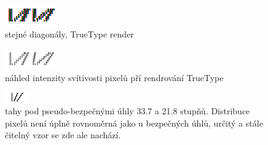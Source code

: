 \documentclass[a4paper]{article}
\begin{document}
\begin{figure}[H]
  \includegraphics[width=\linewidth]{pics/truetype.png}
  \caption{stejné diagonály, TrueType render}
\end{figure}

\begin{figure}[H]
  \includegraphics[width=\linewidth]{pics/truetype_bw.png}
  \caption{náhled intenzity svítivosti pixelů pří rendrování TrueType}
\end{figure}

\begin{figure}[H]
  \includegraphics[width=\linewidth]{pics/pseudo.png}
  \caption{tahy pod pseudo-bezpečnými úhly 33.7 a 21.8 stupňů. Distribuce pixelů není úplně rovnoměrná jako u bezpečných úhlů, určitý a stále čitelný vzor se zde ale nachází.}
\end{figure}
\end{document}
